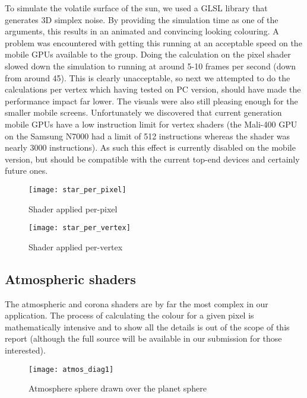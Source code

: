 To simulate the volatile surface of the sun, we used a GLSL library that generates 3D simplex noise. By providing the simulation time as one of the arguments, this results in an animated and convincing looking colouring. A problem was encountered with getting this running at an acceptable speed on the mobile GPUs available to the group. Doing the calculation on the pixel shader slowed down the simulation to running at around 5-10 frames per second (down from around 45). This is clearly unacceptable, so next we attempted to do the calculations per vertex which having tested on PC version, should have made the performance impact far lower. The visuals were also still pleasing enough for the smaller mobile screens. Unfortunately we discovered that current generation mobile GPUs have a low instruction limit for vertex shaders (the Mali-400 GPU on the Samsung N7000 had a limit of 512 instructions whereas the shader was nearly 3000 instructions). As such this effect is currently disabled on the mobile version, but should be compatible with the current top-end devices and certainly future ones.

\begin{figure}[!htbp]
\centering
\begin{minipage}{.5\textwidth}
  \centering
  \texttt{[image: star\_per\_pixel]}
  \caption{Shader applied per-pixel}
  \label{fig:spp}
\end{minipage}%
\begin{minipage}{.5\textwidth}
  \centering
  \texttt{[image: star\_per\_vertex]}
  \caption{Shader applied per-vertex}
  \label{fig:spv}
\end{minipage}
\end{figure}

\subsection{Atmospheric shaders}
\label{atmospheres}

The atmospheric and corona shaders are by far the most complex in our application. The process of calculating the colour for a given pixel is mathematically intensive and to show all the details is out of the scope of this report (although the full source will be available in our submission for those interested). 

\begin{figure}[!htbp]
  \begin{center}
    \leavevmode
    \ifpdf
      \texttt{[image: atmos\_diag1]}
    \fi
    \caption{Atmosphere sphere drawn over the planet sphere}
    \label{FigAtmosDiag1}
  \end{center}
\end{figure}

